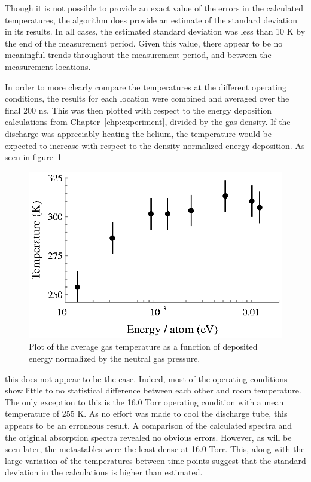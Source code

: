 Though it is not possible to provide an exact value of the errors in the
calculated temperatures, the algorithm does provide an estimate of the standard
deviation in its results. In all cases, the estimated standard deviation was less
than 10 K by the end of the measurement period. Given this value, there appear
to be no meaningful trends throughout the measurement period, and between the
measurement locations.

In order to more clearly compare the temperatures at the different operating
conditions, the results for each location were combined and averaged over the
final 200 ns. This was then plotted with respect to the energy deposition
calculations from Chapter~\ref{chp:experiment}, divided by the gas density. If
the discharge was appreciably heating the helium, the temperature would be
expected to increase with respect to the density-normalized energy deposition.
As seen in figure~\ref{fig:tvp}
\begin{figure}
  \centering
  \includegraphics{./chapters/metastables/figures/tvp.eps}
  \caption{Plot of the average gas temperature as a function of deposited
  energy normalized by the neutral gas pressure.}
  \label{fig:tvp}
\end{figure}
this does not appear to be the case. Indeed, most of the operating conditions
show little to no statistical difference between each other and room
temperature. The only exception to this is the 16.0 Torr operating condition
with a mean temperature of 255 K. As no effort was made to cool the discharge
tube, this appears to be an erroneous result. A comparison of the calculated
spectra and the original absorption spectra revealed no obvious errors. However,
as will be seen later, the metastables were the least dense at 16.0 Torr. This,
along with the large variation of the temperatures between time points suggest
that the standard deviation in the calculations is higher than estimated. 

